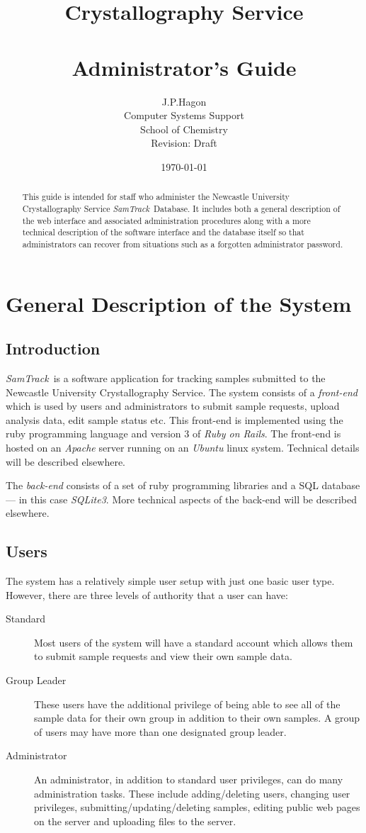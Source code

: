 \documentclass[12pt,twoside]{article}
\title{\sffamily\bfseries Crystallography Service \\ \samtrack\\ Administrator's Guide}
\author{J.P.Hagon\\Computer Systems Support\\School of Chemistry\\
Revision: Draft}
\date{\today}
\newcommand{\samtrack}{\emph{SamTrack}}
\begin{document}
\maketitle
\begin{abstract}
This guide is intended for staff who administer the Newcastle University
Crystallography Service \samtrack\ Database.
It includes both a general description of the web interface and 
associated administration procedures along with a more technical
description of the software interface and the database itself so that
administrators can recover from situations such as a forgotten
administrator password.
\end{abstract}
\tableofcontents
\listoffigures
\listoftables
\newpage
\section{General Description of the System}
\subsection{Introduction}
\samtrack\ is a software application for tracking samples submitted to
the Newcastle University Crystallography Service.
The system consists of a \emph{front-end} which is used by users
and administrators to submit sample requests, upload analysis data,
edit sample status etc.  This front-end is implemented using the 
ruby\cite{rubybook,ruby} programming language and 
version 3 of \emph{Ruby on Rails}\cite{railsbook,rails}.
The front-end is hosted on an \emph{Apache}\cite{apache} server running on an
\emph{Ubuntu}\cite{ubuntu} linux system. 
Technical details will be described elsewhere.

The \emph{back-end} consists of a set of ruby programming libraries
and a SQL database --- in this case 
\emph{SQLite3}\cite{sqlite}.
More technical aspects of the back-end will be described elsewhere.

\subsection{Users}

The system has a relatively simple user setup with just one basic user
type. However, there are three levels of authority that a user can have:
\begin{description}
\item[Standard]
Most users of the system will have a standard account which allows them
to submit sample requests and view their own sample data.
\item[Group Leader]
These users have the additional privilege of being able to see all
of the sample data for their own group in addition to their own
samples. A group of users may have more than one designated group leader.
\item[Administrator]
An administrator, in addition to standard user privileges, can do many
administration tasks. These include adding/deleting users, changing user
privileges, submitting/updating/deleting samples, editing public web
pages on the server and uploading files to the server.
\end{description}
\end{document}
